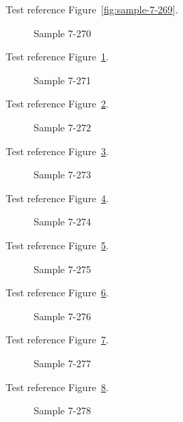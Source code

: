 Test reference Figure~\ref{fig:sample-7-269}.

\begin{figure}[tbhp]
\caption{Sample 7-270}
\label{fig:sample-7-270}
\end{figure}

Test reference Figure~\ref{fig:sample-7-270}.

\begin{figure}[tbhp]
\caption{Sample 7-271}
\label{fig:sample-7-271}
\end{figure}

Test reference Figure~\ref{fig:sample-7-271}.

\begin{figure}[tbhp]
\caption{Sample 7-272}
\label{fig:sample-7-272}
\end{figure}

Test reference Figure~\ref{fig:sample-7-272}.

\begin{figure}[tbhp]
\caption{Sample 7-273}
\label{fig:sample-7-273}
\end{figure}

Test reference Figure~\ref{fig:sample-7-273}.

\begin{figure}[tbhp]
\caption{Sample 7-274}
\label{fig:sample-7-274}
\end{figure}

Test reference Figure~\ref{fig:sample-7-274}.

\begin{figure}[tbhp]
\caption{Sample 7-275}
\label{fig:sample-7-275}
\end{figure}

Test reference Figure~\ref{fig:sample-7-275}.

\begin{figure}[tbhp]
\caption{Sample 7-276}
\label{fig:sample-7-276}
\end{figure}

Test reference Figure~\ref{fig:sample-7-276}.

\begin{figure}[tbhp]
\caption{Sample 7-277}
\label{fig:sample-7-277}
\end{figure}

Test reference Figure~\ref{fig:sample-7-277}.

\begin{figure}[tbhp]
\caption{Sample 7-278}
\label{fig:sample-7-278}
\end{figure}

